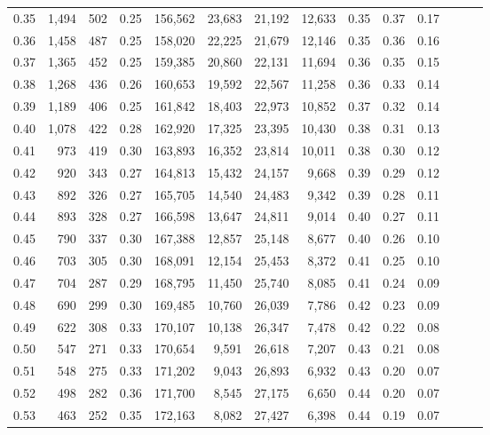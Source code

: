 \begin{tabular}{rrrrrrrrrrrrrr}
0.35 &  1,494 &  502 &  0.25 &  156,562 &   23,683 &  21,192 &  12,633 &  0.35 &  0.37 &      0.17 \\
0.36 &  1,458 &  487 &  0.25 &  158,020 &   22,225 &  21,679 &  12,146 &  0.35 &  0.36 &      0.16 \\
0.37 &  1,365 &  452 &  0.25 &  159,385 &   20,860 &  22,131 &  11,694 &  0.36 &  0.35 &      0.15 \\
0.38 &  1,268 &  436 &  0.26 &  160,653 &   19,592 &  22,567 &  11,258 &  0.36 &  0.33 &      0.14 \\
0.39 &  1,189 &  406 &  0.25 &  161,842 &   18,403 &  22,973 &  10,852 &  0.37 &  0.32 &      0.14 \\
0.40 &  1,078 &  422 &  0.28 &  162,920 &   17,325 &  23,395 &  10,430 &  0.38 &  0.31 &      0.13 \\
0.41 &    973 &  419 &  0.30 &  163,893 &   16,352 &  23,814 &  10,011 &  0.38 &  0.30 &      0.12 \\
0.42 &    920 &  343 &  0.27 &  164,813 &   15,432 &  24,157 &   9,668 &  0.39 &  0.29 &      0.12 \\
0.43 &    892 &  326 &  0.27 &  165,705 &   14,540 &  24,483 &   9,342 &  0.39 &  0.28 &      0.11 \\
0.44 &    893 &  328 &  0.27 &  166,598 &   13,647 &  24,811 &   9,014 &  0.40 &  0.27 &      0.11 \\
0.45 &    790 &  337 &  0.30 &  167,388 &   12,857 &  25,148 &   8,677 &  0.40 &  0.26 &      0.10 \\
0.46 &    703 &  305 &  0.30 &  168,091 &   12,154 &  25,453 &   8,372 &  0.41 &  0.25 &      0.10 \\
0.47 &    704 &  287 &  0.29 &  168,795 &   11,450 &  25,740 &   8,085 &  0.41 &  0.24 &      0.09 \\
0.48 &    690 &  299 &  0.30 &  169,485 &   10,760 &  26,039 &   7,786 &  0.42 &  0.23 &      0.09 \\
0.49 &    622 &  308 &  0.33 &  170,107 &   10,138 &  26,347 &   7,478 &  0.42 &  0.22 &      0.08 \\
0.50 &    547 &  271 &  0.33 &  170,654 &    9,591 &  26,618 &   7,207 &  0.43 &  0.21 &      0.08 \\
0.51 &    548 &  275 &  0.33 &  171,202 &    9,043 &  26,893 &   6,932 &  0.43 &  0.20 &      0.07 \\
0.52 &    498 &  282 &  0.36 &  171,700 &    8,545 &  27,175 &   6,650 &  0.44 &  0.20 &      0.07 \\
0.53 &    463 &  252 &  0.35 &  172,163 &    8,082 &  27,427 &   6,398 &  0.44 &  0.19 &      0.07 \\

\end{tabular}
